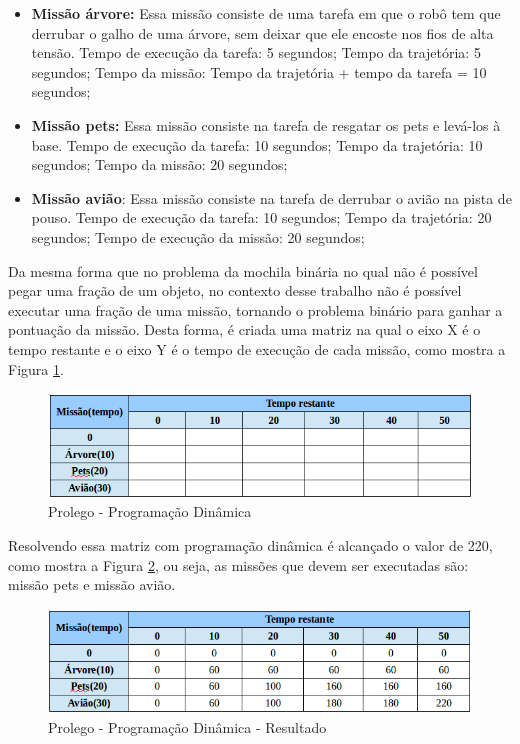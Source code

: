 \begin{itemize}
\item \textbf{Missão árvore:} Essa missão consiste de uma tarefa em que o robô tem que derrubar o galho de uma árvore, sem deixar que ele encoste nos fios de alta tensão. Tempo de execução da tarefa: 5 segundos; Tempo da trajetória: 5 segundos; Tempo da missão: Tempo da trajetória + tempo da tarefa = 10 segundos;
\item \textbf{Missão pets:} Essa missão consiste na tarefa de resgatar os pets e levá-los à base. Tempo de execução da tarefa: 10 segundos; Tempo da trajetória: 10 segundos; Tempo da missão: 20 segundos;
\item \textbf{Missão avião}: Essa missão consiste na tarefa de derrubar o avião na pista de pouso. Tempo de execução da tarefa: 10 segundos; Tempo da trajetória: 20 segundos; Tempo de execução da missão: 20 segundos;
\end{itemize}

Da mesma forma que no problema da mochila binária no qual não é possível pegar uma fração de um objeto, no contexto desse trabalho não é possível executar uma fração de uma missão, tornando o problema binário para ganhar a pontuação da missão. Desta forma, é criada uma matriz na qual o eixo X é o tempo restante e o eixo Y é o tempo de execução de cada missão, como mostra a Figura \ref{matrizProlego}.

\FloatBarrier
\begin{figure}[!h]
\centering
\includegraphics[keepaspectratio=true,scale=0.6]{figuras/matrizProlego.png}
\caption{Prolego - Programação Dinâmica}
\label{matrizProlego}
\end{figure}


Resolvendo essa matriz com programação dinâmica é alcançado o valor de 220, como mostra a Figura \ref{matrizProlegoResult}, ou seja, as missões que devem ser executadas são: missão pets e missão avião.  

\FloatBarrier
\begin{figure}[!h]
\centering
\includegraphics[keepaspectratio=true,scale=0.6]{figuras/matrizProlegoResult.png}
\caption{Prolego - Programação Dinâmica - Resultado}
\label{matrizProlegoResult}
\end{figure}

